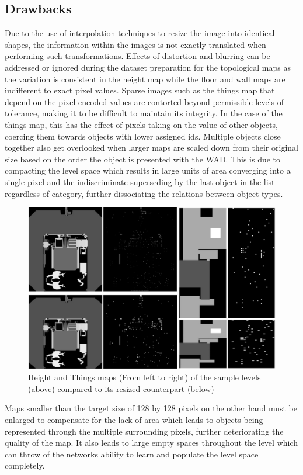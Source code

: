 \documentclass{Configuration_Files/PoliMi3i_thesis}
\begin{document}
\subsection{Drawbacks}
Due to the use of interpolation techniques to resize the image into identical shapes, 
the information within the images is not exactly translated when performing such 
transformations. Effects of distortion and blurring can be addressed or ignored 
during the dataset preparation for the topological maps as the variation is consistent 
in the height map while the floor and wall maps are indifferent to exact pixel values. 
Sparse images such as the things map that depend on the pixel encoded values are 
contorted beyond permissible levels of tolerance, making it to be difficult to 
maintain its integrity. In the case of the things map, this has the effect of pixels taking 
on the value of other objects, coercing them towards objects with lower assigned ids. 
Multiple objects close together also get overlooked when larger maps are scaled 
down from their original size based on the order the object is presented with the 
WAD. This is due to compacting the level space which results in large units of area 
converging into a single pixel and the indiscriminate superseding by the last object in 
the list regardless of category, further dissociating the relations between object types.
\begin{figure}[H]
    \centering
    \includegraphics[width=1\textwidth]{feature_map_mistakes.jpg}
    \caption[Resized feature maps comparison]{Height and Things maps (From left to right) of the sample levels (above) 
compared to its resized counterpart (below)}
    \label{fig:featuremapistakes}
\end{figure}
Maps smaller than the target size of 128 by 128 pixels on the other hand must be 
enlarged to compensate for the lack of area which leads to objects being represented 
through the multiple surrounding pixels, further deteriorating the quality of the 
map. It also leads to large empty spaces throughout the level which can throw of the 
networks ability to learn and populate the level space completely.
\end{document}
